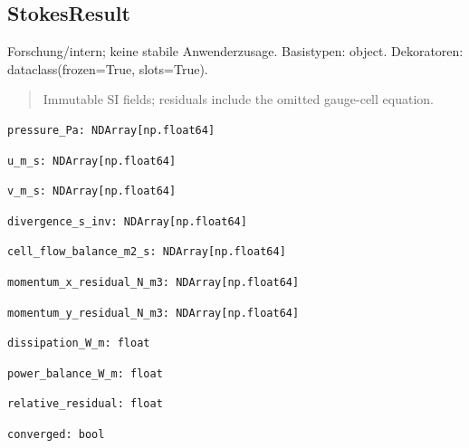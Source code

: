 \subsection{StokesResult}
Forschung/intern; keine stabile Anwenderzusage.
Basistypen: object. Dekoratoren: dataclass(frozen=True, slots=True).
\begin{quote}
Immutable SI fields; residuals include the omitted gauge-cell equation.
\end{quote}
\begin{lstlisting}
pressure_Pa: NDArray[np.float64]
\end{lstlisting}
\begin{lstlisting}
u_m_s: NDArray[np.float64]
\end{lstlisting}
\begin{lstlisting}
v_m_s: NDArray[np.float64]
\end{lstlisting}
\begin{lstlisting}
divergence_s_inv: NDArray[np.float64]
\end{lstlisting}
\begin{lstlisting}
cell_flow_balance_m2_s: NDArray[np.float64]
\end{lstlisting}
\begin{lstlisting}
momentum_x_residual_N_m3: NDArray[np.float64]
\end{lstlisting}
\begin{lstlisting}
momentum_y_residual_N_m3: NDArray[np.float64]
\end{lstlisting}
\begin{lstlisting}
dissipation_W_m: float
\end{lstlisting}
\begin{lstlisting}
power_balance_W_m: float
\end{lstlisting}
\begin{lstlisting}
relative_residual: float
\end{lstlisting}
\begin{lstlisting}
converged: bool
\end{lstlisting}
